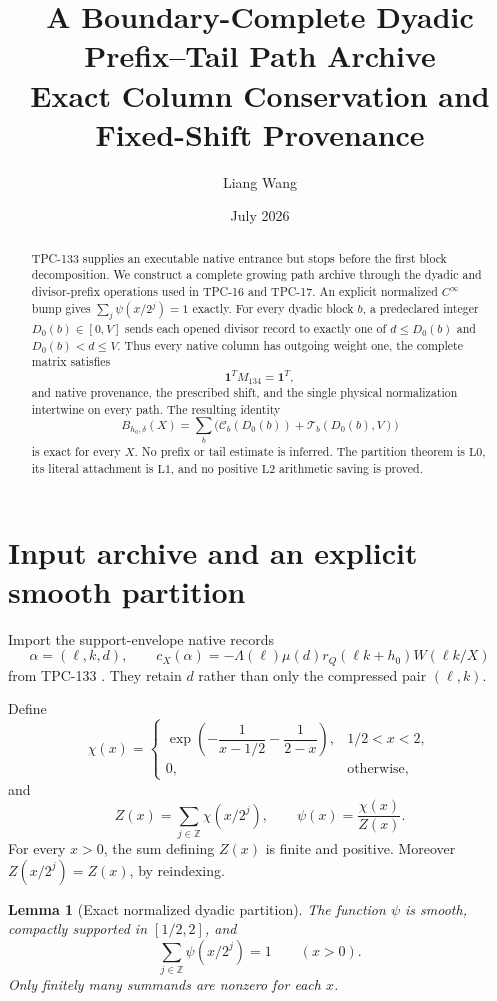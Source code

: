 \documentclass[11pt]{article}
\title{\textbf{A Boundary-Complete Dyadic Prefix--Tail Path Archive}\\
\large Exact Column Conservation and Fixed-Shift Provenance}
\author{Liang Wang}
\date{July 2026}
\newtheorem{lemma}[theorem]{Lemma}
\theoremstyle{definition}
\theoremstyle{remark}
\newcommand{\one}{\mathbf 1}
\newcommand{\Lzero}{\mathrm{L0}}
\newcommand{\Lone}{\mathrm{L1}}
\newcommand{\Ltwo}{\mathrm{L2}}
\begin{document}
\maketitle

\begin{abstract}
TPC-133 supplies an executable native entrance but stops before the
first block decomposition.  We construct a complete growing path
archive through the dyadic and divisor-prefix operations used in
TPC-16 and TPC-17.  An explicit normalized \(C^\infty\) bump gives
\(\sum_j\psi(x/2^j)=1\) exactly.  For every dyadic block \(b\), a
predeclared integer \(D_0(b)\in[0,V]\) sends each opened divisor
record to exactly one of \(d\le D_0(b)\) and
\(D_0(b)<d\le V\).  Thus every native column has outgoing weight one,
the complete matrix satisfies
\[
 \one^TM_{134}=\one^T,
\]
and native provenance, the prescribed shift, and the single physical
normalization intertwine on every path.  The resulting identity
\[
 B_{h_0,\delta}(X)=
 \sum_b\bigl(\mathcal C_b(D_0(b))+
                  \mathcal T_b(D_0(b),V)\bigr)
\]
is exact for every \(X\).  No prefix or tail estimate is inferred.
The partition theorem is \(\Lzero\), its literal attachment is
\(\Lone\), and no positive \(\Ltwo\) arithmetic saving is proved.
\end{abstract}

\section{Input archive and an explicit smooth partition}

Import the support-envelope native records
\[
 \alpha=(\ell,k,d),\qquad
 c_X(\alpha)=
 -\Lambda(\ell)\mu(d)r_Q(\ell k+h_0)W(\ell k/X)
\]
from TPC-133 \citep{WangTPC133}.  They retain \(d\) rather than only
the compressed pair \((\ell,k)\).

Define
\[
 \chi(x)=
 \begin{cases}
 \exp\!\left(-\dfrac1{x-1/2}-\dfrac1{2-x}\right),
   &1/2<x<2,\\
 0,&\text{otherwise},
 \end{cases}
\]
and
\[
 Z(x)=\sum_{j\in\mathbb Z}\chi(x/2^j),
 \qquad
 \psi(x)=\frac{\chi(x)}{Z(x)}.
\]
For every \(x>0\), the sum defining \(Z(x)\) is finite and positive.
Moreover \(Z(x/2^j)=Z(x)\), by reindexing.

\begin{lemma}[Exact normalized dyadic partition]
\label{lem:partition}
The function \(\psi\) is smooth, compactly supported in
\([1/2,2]\), and
\[
 \boxed{\sum_{j\in\mathbb Z}\psi(x/2^j)=1}
 \qquad(x>0).
\]
Only finitely many summands are nonzero for each \(x\).
\end{lemma}
\end{document}
